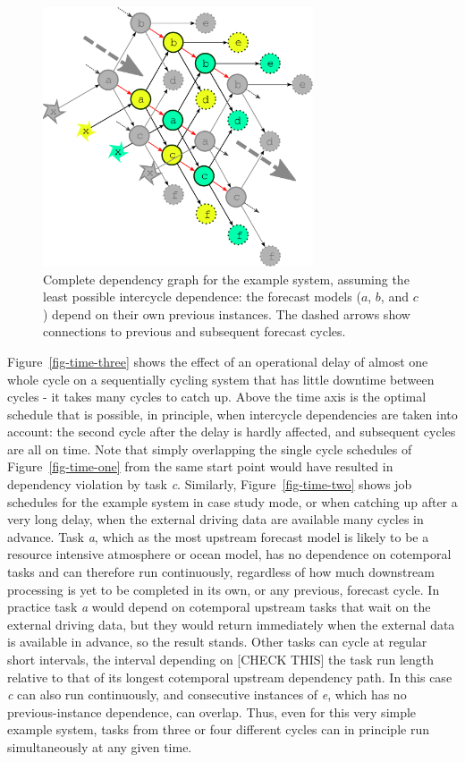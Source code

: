\documentclass[11pt,a4paper]{article}
\begin{document}
\begin{figure} 
    \begin{center}
        \includegraphics[width=8cm]{inkscape-svg/dep-multi-cycle} 
    \end{center}
    \caption{\small Complete dependency graph for the example
    system, assuming the least possible intercycle dependence: the
    forecast models ($a$, $b$, and $c$) depend on their own previous
    instances. The dashed arrows show connections to previous and
    subsequent forecast cycles.} 
    \label{fig-dep-two}
\end{figure}



Figure~\ref{fig-time-three} shows the effect of an operational delay of
almost one whole cycle on a sequentially cycling system that has little
downtime between cycles - it takes many cycles to catch up. Above the
time axis is the optimal schedule that is possible, in principle, when
intercycle dependencies are taken into account: the second cycle after
the delay is hardly affected, and subsequent cycles are all on time.
Note that simply overlapping the single cycle schedules of 
Figure~\ref{fig-time-one} from the same start point would have resulted in
dependency violation by task {\em c}. Similarly,
Figure~\ref{fig-time-two} shows job schedules for the example system in
case study mode, or when catching up after a very long delay, when the
external driving data are available many cycles in advance.  Task {\em
a}, which as the most upstream forecast model is likely to be a resource
intensive atmosphere or ocean model, has no dependence on cotemporal
tasks and can therefore run continuously, regardless of how much
downstream processing is yet to be completed in its own, or any
previous, forecast cycle. In practice task {\em a} would depend on
cotemporal upstream tasks that wait on the external driving data, but
they would return immediately when the external data is available in
advance, so the result stands. Other tasks can cycle at regular short
intervals, the interval depending on [CHECK THIS] the task run length
relative to that of its longest cotemporal upstream dependency path. In
this case {\em c} can also run continuously, and consecutive instances
of {\em e}, which has no previous-instance dependence, can overlap.
Thus, even for this very simple example system, tasks from three or four
different cycles can in principle run simultaneously at any given
time. 
\end{document}
